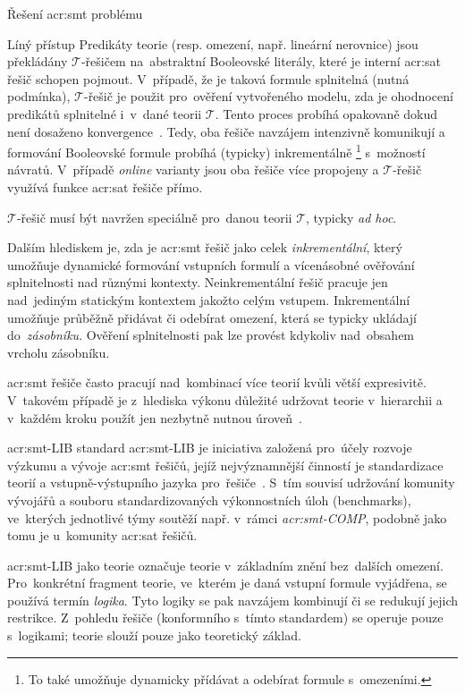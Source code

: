 \documentclass[thesis=M,czech]{FITthesis}[2012/06/26]
\newcommand{\acrlabel}[1]{acr:#1}
\newcommand{\acr}[1]{\acrshort{\acrlabel{#1}}}
\newcommand{\hl}[1]{\textit{#1}}
\newcommand{\name}[1]{\hl{#1}}
\newcommand{\cit}[1]{\cite{#1}}
\newcommand{\set}[1]{\ensuremath{\mathcal{#1}}}
\begin{document}
\begin{section}{Řešení \acr{smt} problému}
\begin{paragraph}{Líný přístup}
Predikáty teorie (resp. omezení, např. lineární nerovnice)
jsou překládány \set{T}-řešičem
na~abstraktní Booleovské literály,
které je interní \acr{sat} řešič schopen pojmout.
V~případě, že je taková formule splnitelná (nutná podmínka),
\set{T}-řešič je použit pro~ověření vytvořeného modelu,
zda je ohodnocení predikátů splnitelné i~v~dané teorii \set{T}.
Tento proces probíhá opakovaně
dokud není dosaženo konvergence~\cit{smt-de_moura}.
Tedy, oba řešiče navzájem intenzivně komunikují
a formování Booleovské formule probíhá (typicky) inkrementálně%
\footnote{To také umožňuje dynamicky
přídávat a odebírat formule s~omezeními.}
s~možností návratů.
V~případě \name{online} varianty jsou oba řešiče
více propojeny a \set{T}-řešič využívá funkce \acr{sat} řešiče přímo.

\set{T}-řešič musí být navržen
speciálně pro~danou teorii \set{T}, typicky \hl{ad hoc}.
\end{paragraph} %


\bigskip

Dalším hlediskem je, zda je \acr{smt} řešič jako celek
\name{inkrementální}, který umožňuje
dynamické formování vstupních formulí
a vícenásobné ověřování splnitelnosti nad různými kontexty.
Neinkrementální řešič pracuje jen nad~jediným statickým kontextem
jakožto celým vstupem. Inkrementální umožňuje
průběžně přidávat či odebírat omezení,
která se typicky ukládají do~\hl{zásobníku}.
Ověření splnitelnosti pak lze provést kdykoliv
nad~obsahem vrcholu zásobníku.

\acr{smt} řešiče často pracují nad~kombinací více teorií
kvůli větší expresivitě.
V~takovém případě je z~hlediska výkonu
důležité udržovat teorie v~hierarchii
a v~každém kroku použít
jen nezbytně nutnou úroveň~\cit{smt-stanford}.


\begin{subsection}{\acr{smt}-LIB standard}\label{ss:search:smt:smtlib}
\acr{smt}-LIB je iniciativa
založená pro~účely rozvoje výzkumu a vývoje \acr{smt} řešičů,
jejíž nejvýznamnější činností
je standardizace teorií
a vstupně-výstupního jazyka pro~řešiče~\cit{smtlib}.
S~tím souvisí udržování komunity vývojářů
a souboru standardizovaných výkonnostních úloh (benchmarks),
ve~kterých jednotlivé týmy soutěží např. v~rámci \name{\acr{smt}-COMP},
podobně jako tomu je u~komunity \acr{sat} řešičů.

\acr{smt}-LIB jako teorie označuje
teorie v~základním znění bez~dalších omezení.
Pro~konkrétní fragment teorie,
ve~kterém je daná vstupní formule vyjádřena,
se používá termín \name{logika}.
Tyto logiky se pak navzájem kombinují
či se redukují jejich restrikce.
Z~pohledu řešiče (konformního s~tímto standardem)
se operuje pouze s~logikami;
teorie slouží pouze jako teoretický základ.


\end{subsection}
\end{section}
\end{document}
